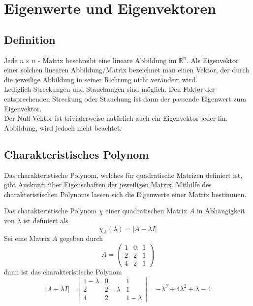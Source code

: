 
\section{Eigenwerte und Eigenvektoren}
\label{sec:eigenwerte_und_eigenvektoren}

\subsection{Definition}
\label{sub:definition}
Jede $n \times n$ - Matrix beschreibt eine lineare Abbildung im $\mathbb{R}^n$.
Als Eigenvektor einer solchen linearen Abbildung/Matrix bezeichnet man einen Vektor, der durch die jeweilige 
Abbildung in seiner Richtung nicht verändert wird.\\
Lediglich Streckungen und Stauchungen sind möglich. Den Faktor der entsprechenden 
Streckung oder Stauchung ist dann der passende Eigenwert zum Eigenvektor.\\
Der Null-Vektor ist trivialerweise natürlich auch ein Eigenvektor jeder lin. Abbildung, wird jedoch nicht beachtet.

\subsection{Charakteristisches Polynom}
\label{sub:charakteristisches_polynom}

Das charakteristische Polynom, welches für quadratische Matrizen definiert ist, gibt Auskunft über Eigenschaften
der jeweiligen Matrix. Mithilfe des charakteristischen Polynoms lassen sich die Eigenwerte einer Matrix bestimmen.

Das charakteristische Polynom $\chi$ einer quadratischen Matrix $A$ in Abhängigkeit von $\lambda$ 
ist definiert als 
\begin{equation}
	\chi_A(\lambda) = |A - \lambda I|
\end{equation}
Sei eine Matrix $A$ gegeben durch
\begin{displaymath}
	A = \left( \begin{matrix}1 & 0 & 1 \\ 2 & 2 & 1 \\ 4 & 2 & 1 \end{matrix} \right)
\end{displaymath}
dann ist das charakteristische Polynom
\begin{displaymath}
	|A - \lambda I| 
	= \left| \begin{matrix} 1 - \lambda & 0 & 1 \\ 2 & 2 - \lambda & 1 \\ 4 & 2 & 1 -\lambda \end{matrix} \right|
	= - \lambda^3 + 4 \lambda^2 + \lambda - 4
\end{displaymath}

